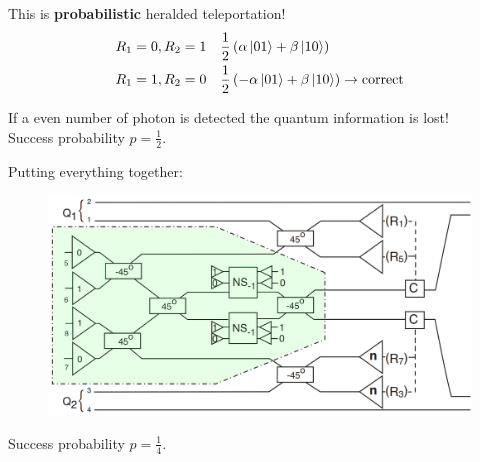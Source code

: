 \documentclass{beamer}
\begin{document}
\begin{frame}
\begin{center}

This is \textbf{probabilistic} heralded teleportation!
\begin{align*}
& R_1 = 0, R_2 = 1 \quad \frac{1}{2} \left( \alpha \ket{01} + \beta \ket{10} \right)\\
& R_1 = 1, R_2 = 0 \quad \frac{1}{2} \left( - \alpha \ket{01} + \beta \ket{10} \right) \rightarrow \text{correct}\\
\end{align*}

If a even number of photon is detected the quantum information is lost!\\	

Success probability $p = \frac{1}{2}$.

\end{center}
\end{frame}

\begin{frame}
\begin{center}
Putting everything together:

\begin{figure}[!htb]
\centering
\includegraphics[scale=.20]{immagini/together.png}
\end{figure}

Success probability $ p = \frac{1}{4}$.

\end{center}
\end{frame}
\end{document}
